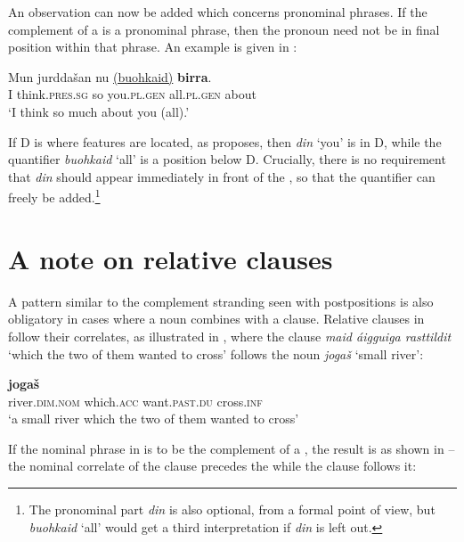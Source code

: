 \documentclass[output=paper]{LSP/langsci}
\begin{document}
An observation can now be added which concerns pronominal phrases. If the complement of a  is a pronominal phrase, then the pronoun need not be in final position within that phrase. An example is given in :


\ea%
    \label{ex:julien:34}
   
    \gll   Mun  jurddašan      nu          \uline{(buohkaid)}    \textbf{birra}. \\ 
	   I    think.\textsc{pres.sg}  so    you.\textsc{pl.gen}   all.\textsc{pl.gen}    about\\
    \glt     ‘I think so much about you (all).’
    \z

If D is where  features are located, as \citet{Longobardi2008} proposes, then \textit{din} ‘you\textsc{’} is in D, while the quantifier \textit{buohkaid} ‘all’ is a position below D. Crucially, there is no requirement that \textit{din} should appear immediately in front of the , so that the quantifier can freely be added.\footnote{The pronominal part \textit{din} is also optional, from a formal point of view, but \textit{buohkaid} ‘all’ would get a third  interpretation if \textit{din} is left out.}

\section{A note on relative clauses} %

A pattern similar to the complement stranding seen with  postpositions is also obligatory in cases where a noun combines with a  clause. Relative clauses in  follow their correlates, as illustrated in , where the  clause \textit{maid áigguiga rasttildit} \textsc{‘}which the two of them wanted to cross’ follows the noun \textit{joga}\textit{š} ‘small river’:

\ea%
    \label{ex:julien:35}
   
    \gll     \textbf{joga}\textbf{š}                     \\ 
	 river.\textsc{dim.nom}    which.\textsc{acc}  want.\textsc{past.du} cross.\textsc{inf}\\
    \glt  ‘a small river which the two of them wanted to cross’
    \z

	
If the nominal phrase in  is to be the complement of a , the result is as shown in  – the nominal correlate of the  clause precedes the  while the  clause follows it:
\end{document}
